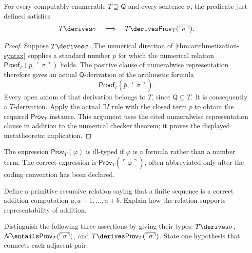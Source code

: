 \begin{lemma}
\label{lem:p05-numeralwise-d1}
For every computably enumerable \(T\supseteq\mathsf Q\) and every
sentence \(\sigma\), the predicate just defined satisfies
\[
 T\derives\sigma\quad\Longrightarrow\quad
 T\derives\mathsf{Prov}_T(\overline{\ulcorner\sigma\urcorner}).
\]
\end{lemma}
\begin{proof}
Suppose \(T\derives\sigma\).  The numerical direction of
\cref{thm:arithmetization-syntax} supplies a standard number \(p\) for
which the numerical relation
\(\mathsf{Proof}_T(p,\ulcorner\sigma\urcorner)\) holds.
The positive clause of numeralwise representation therefore gives an actual
\(\mathsf Q\)-derivation of the arithmetic formula
\[
 \mathsf{Proof}_T(\bar p,\overline{\ulcorner\sigma\urcorner}).
\]
Every open axiom of that derivation belongs to \(T\), since
\(\mathsf Q\subseteq T\).  It is consequently a \(T\)-derivation.
Apply the actual \(\exists I\) rule with the closed term \(\bar p\)
to obtain the required \(\mathsf{Prov}_T\) instance.  This argument uses
the cited numeralwise representation clause in addition to the numerical
checker theorem; it proves the displayed metatheoretic implication.
\end{proof}

\begin{warning}
The expression \(\mathsf{Prov}_T(\varphi)\) is ill-typed if \(\varphi\) is a
formula rather than a number term.  The correct expression is
\(\mathsf{Prov}_T(\overline{\ulcorner\varphi\urcorner})\), often abbreviated
only after the coding convention has been declared.
\end{warning}

\begin{exercise}
\label{ex:arithmetic-coding-02}
Define a primitive recursive relation saying that a finite sequence is a
correct addition computation
\(a,a+1,\ldots,a+b\).  Explain how the relation supports representability of
addition.
\end{exercise}

\begin{exercise}
\label{ex:arithmetic-coding-03}
Distinguish the following three assertions by giving their types:
\(T\derives\sigma\),
\(\mathcal N\entails\mathsf{Prov}_T(\overline{\ulcorner\sigma\urcorner})\),
and
\(T\derives\mathsf{Prov}_T(\overline{\ulcorner\sigma\urcorner})\).
State one hypothesis that connects each adjacent pair.
\end{exercise}
